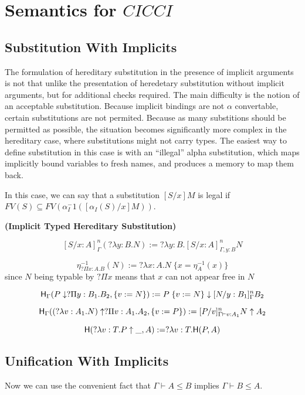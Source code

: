 \section{Semantics for $CICCI$}


\subsection{Substitution With Implicits}

The formulation of hereditary substitution in the presence of 
implicit arguments is not that unlike the presentation of
heredetary substitution without implicit arguments, 
but for additional checks required.
The main difficulty is the notion of an acceptable substitution. 
Because implicit bindings are not $\alpha$ convertable, 
certain substitutions are not permited.  
Because as many substitions should be permitted as possible, 
the situation becomes significantly more complex in the 
hereditary case, where substitutions might not carry types.  
The easiest way to define substitution in this case is with an ``illegal'' alpha substitution, 
which maps implicitly bound variables to fresh names, 
and produces a memory to map them back.

In this case, we can say that a substitution $[S/x] M$ is legal if 
$FV(S) \subseteq FV(\alpha_I^-1( [\alpha_I(S)/x] M) )$.

\begin{definition}
\textbf{(Implicit Typed Hereditary Substitution)}


\[
[S / x : A]^n_{\Gamma } (?\lambda y : B . N) := ?\lambda y:B . [S / x : A]^n_{\Gamma, y : B} N
\] 

\[
\eta^{-1}_{?\Pi x : A . B}(N) := ?\lambda x : A . N \; \{ x = \eta^{-1}_A(x) \}
\] since $N$ being typable by $?\Pi x $ means that $x$ can not appear free in $N$

\[
\mathsf{H}_{\Gamma}(P \downarrow ?\Pi y : B_1 . B_2 , \{ v := N \} ) := P\; \{ v := N \} \downarrow [N/y : B_1]^n_{\Gamma}B_2
\]

\[
\mathsf{H}_{\Gamma} ((?\lambda v : A_1 . N) \uparrow ?\Pi v : A_1 . A_2 , \{ v := P \}) 
:= [P/v]^n_{\Gamma \vdash v : A_1} N \uparrow A_2
\]

\[ 
\mathsf{H}(?\lambda v : T . P \uparrow \_ , A) := ?\lambda v : T . \mathsf{H}(P,A)
\]

\label{def:hered}
\end{definition}



\subsection{Unification With Implicits}

Now we can use the convenient fact that $\Gamma \vdash A  \leq B$ implies $\Gamma \vdash B \leq A$.